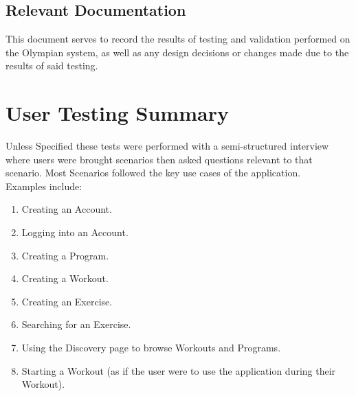 \documentclass[12pt, titlepage]{article}
\begin{document}
\newpage

\tableofcontents

\listoftables %

\newpage


\subsection{Relevant Documentation}


This document serves to record the results of testing and validation performed on the Olympian system, as well as any design decisions or changes made due to the results of said testing.

\section{User Testing Summary}
Unless Specified these tests were performed with a semi-structured interview where users were brought scenarios then asked questions relevant to that scenario. Most Scenarios followed the key use cases of the application.\\
Examples include:
\begin{enumerate}
	\item Creating an Account.
	\item Logging into an Account.
	\item Creating a Program.
	\item Creating a Workout.
	\item Creating an Exercise.
	\item Searching for an Exercise.
	\item Using the Discovery page to browse Workouts and Programs.
	\item Starting a Workout (as if the user were to use the application during their Workout).
\end{enumerate}
\end{document}
